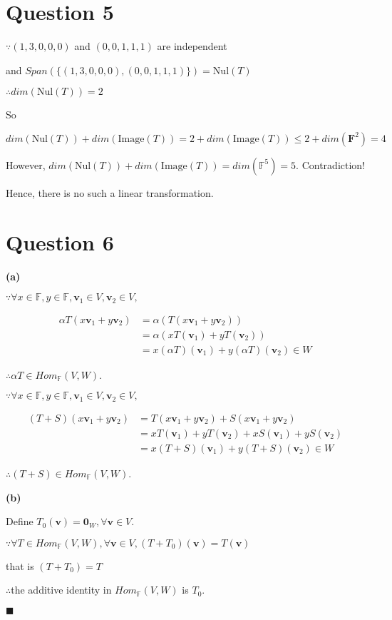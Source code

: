 \documentclass[12pt]{article}
\renewcommand{\qed}{\hfill$\blacksquare$}
\renewenvironment{proof}{\begin{addmargin}[1em]{0em}\begin{newproof}}{\end{newproof}\end{addmargin}\qed}
\begin{document}
\pagebreak

\section{Question 5}
\noindent

$\because (1,3,0,0,0)$ and $(0,0,1,1,1)$ are independent

and $Span(\{(1,3,0,0,0),(0,0,1,1,1)\})=\textrm{Nul}(T)$

$\therefore dim(\textrm{Nul}(T))=2$

So

$dim(\textrm{Nul}(T))+dim(\textrm{Image}(T))=2+dim(\textrm{Image}(T))\leq2+dim(\mathbf{F}^2)=4$

However, $dim(\textrm{Nul}(T))+dim(\textrm{Image}(T))=dim(\mathbb{F}^5)=5$. Contradiction!

Hence, there is no such a linear transformation.

\pagebreak

\section{Question 6}

\begin{proof}{}
    \noindent

    \noindent
    \textbf{(a)}

    $\because\forall x\in\mathbb{F},y\in\mathbb{F},\mathbf{v}_1\in V,\mathbf{v}_2\in V,$

    \[
        \begin{aligned}
            \alpha T(x\mathbf{v}_1+y\mathbf{v}_2)&=\alpha (T(x\mathbf{v}_1+y\mathbf{v}_2))\\
            &=\alpha (xT(\mathbf{v}_1)+yT(\mathbf{v}_2))\\
            &=x(\alpha T)(\mathbf{v}_1)+y(\alpha T)(\mathbf{v}_2)\in W
        \end{aligned}
    \]

    $\therefore \alpha T\in Hom_{\mathbb{F}}(V,W)$.

    $\because\forall x\in\mathbb{F},y\in\mathbb{F},\mathbf{v}_1\in V,\mathbf{v}_2\in V,$

    \[
        \begin{aligned}
            (T+S)(x\mathbf{v}_1+y\mathbf{v}_2)&=T(x\mathbf{v}_1+y\mathbf{v}_2)+S(x\mathbf{v}_1+y\mathbf{v}_2)\\
            &=xT(\mathbf{v}_1)+yT(\mathbf{v}_2)+xS(\mathbf{v}_1)+yS(\mathbf{v}_2)\\
            &=x(T+S)(\mathbf{v}_1)+y(T+S)(\mathbf{v}_2)\in W
        \end{aligned}
    \]

    $\therefore (T+S)\in Hom_{\mathbb{F}}(V,W)$.

    \noindent
    \textbf{(b)}

    Define $T_0(\mathbf{v})=\mathbf{0}_W,\forall\mathbf{v}\in V$.

    $\because \forall T\in Hom_{\mathbb{F}}(V,W),\forall\mathbf{v}\in V,(T+T_0)(\mathbf{v})=T(\mathbf{v})$
    
    that is $(T+T_0)=T$

    $\therefore$the additive identity in $Hom_{\mathbb{F}}(V,W)$ is $T_0$.
\end{proof}
\end{document}
